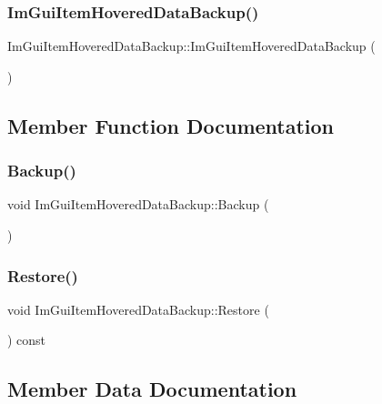 \subsubsection{\texorpdfstring{Im\+Gui\+Item\+Hovered\+Data\+Backup()}{ImGuiItemHoveredDataBackup()}}
{\footnotesize\ttfamily Im\+Gui\+Item\+Hovered\+Data\+Backup\+::\+Im\+Gui\+Item\+Hovered\+Data\+Backup (\begin{DoxyParamCaption}{ }\end{DoxyParamCaption})}



\subsection{Member Function Documentation}
\hypertarget{struct_im_gui_item_hovered_data_backup_a2084500d9cbc9455e52fbe87c95f2315}{}\label{struct_im_gui_item_hovered_data_backup_a2084500d9cbc9455e52fbe87c95f2315} 
\subsubsection{\texorpdfstring{Backup()}{Backup()}}
{\footnotesize\ttfamily void Im\+Gui\+Item\+Hovered\+Data\+Backup\+::\+Backup (\begin{DoxyParamCaption}{ }\end{DoxyParamCaption})}

\hypertarget{struct_im_gui_item_hovered_data_backup_ae812e9cff1c84c7b438a5af502d778f5}{}\label{struct_im_gui_item_hovered_data_backup_ae812e9cff1c84c7b438a5af502d778f5} 
\subsubsection{\texorpdfstring{Restore()}{Restore()}}
{\footnotesize\ttfamily void Im\+Gui\+Item\+Hovered\+Data\+Backup\+::\+Restore (\begin{DoxyParamCaption}{ }\end{DoxyParamCaption}) const}



\subsection{Member Data Documentation}
\hypertarget{struct_im_gui_item_hovered_data_backup_a5e0b18013d983269deba7976666fc501}{}\label{struct_im_gui_item_hovered_data_backup_a5e0b18013d983269deba7976666fc501} 
